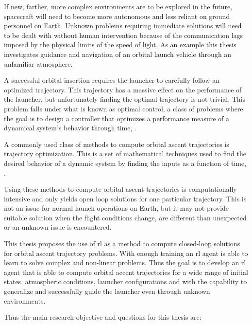 If new, farther, more complex environments are to be explored in the future, spacecraft will need to become more autonomous and less reliant on ground personnel on Earth. Unknown problems requiring immediate solutions will need to be dealt with without human intervention because of the communication lags imposed by the physical limits of the speed of light. As an example this thesis investigates guidance and navigation of an orbital launch vehicle through an unfamiliar atmosphere.

A successful orbital insertion requires the launcher to carefully follow an optimized trajectory. This trajectory has a massive effect on the performance of the launcher, but unfortunately finding the optimal trajectory is not trivial. This problem falls under what is known as optimal control, a class of problems where the goal is to design a controller that optimizes a performance measure of a dynamical system's behavior through time, \cite{sutton2018reinforcement, betts2010practical}. 

A commonly used class of methods to compute orbital ascent trajectories is trajectory optimization. This is a set of mathematical techniques used to find the desired behavior of a dynamic system by finding the inputs as a function of time, \cite{betts2010practical, kelly2017introduction}. 

Using these methods to compute orbital ascent trajectories is computationally intensive and only yields open loop solutions for one particular trajectory. This is not an issue for normal launch operations on Earth, but it may not provide suitable solution when the flight conditions change, are different than unexpected or an unknown issue is encountered.

This thesis proposes the use of \acrfull{rl} as a method to compute closed-loop solutions for orbital ascent trajectory problems. With enough training an \acrshort{rl} agent is able to learn to solve complex and non-linear problems. Thus the goal is to develop an \acrshort{rl} agent that is able to compute orbital accent trajectories for a wide range of initial states, atmospheric conditions, launcher configurations and with the capability to generalize and successfully guide the launcher even through unknown environments.

Thus the main research objective and questions for this thesis are:


